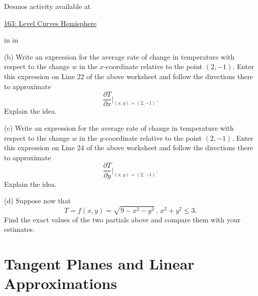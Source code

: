 \documentclass{ximera}
\newcommand{\pskip}{\vskip 0.1 in}
\begin{document}
\begin{example}
Desmos activity available at

\href{https://www.desmos.com/calculator/mrbwyydrcm}{163: Level Curves Hemisphere}

\pskip \pskip


(b) Write an expression for the average rate of change in temperature with respect to the change $w$ in the $x$-coordinate relative to the point $(2,-1)$. Enter this expression on Line 22 of the above worksheet and follow the directions there to approximate 
\[
   \frac{\partial T}{\partial x}\Big|_{(x,y)=(2,-1)} .
\]
Explain the idea.

(c) Write an expression for the average rate of change in temperature with respect to the change $w$ in the $y$-coordinate relative to the point $(2,-1)$. Enter this expression on Line 24 of the above worksheet and follow the directions there to approximate 
\[
   \frac{\partial T}{\partial y}\Big|_{(x,y)=(2,-1)} .
\]
Explain the idea.

(d) Suppose now that 
\[
    T = f(x,y) = \sqrt{9-x^2-y^2} \, , \, x^2 + y^2 \leq 3 .
\]
Find the exact values of the two partials above and compare them with your estimates.

\end{example}

\section{Tangent Planes and Linear Approximations}
\end{document}
